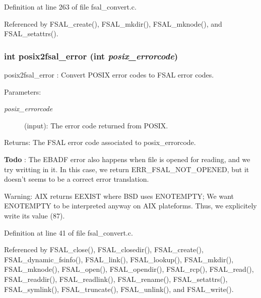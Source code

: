 Definition at line 263 of file fsal\_\-convert.c.

Referenced by FSAL\_\-create(), FSAL\_\-mkdir(), FSAL\_\-mknode(), and FSAL\_\-setattrs().
\subsubsection[{posix2fsal\_\-error}]{\setlength{\rightskip}{0pt plus 5cm}int posix2fsal\_\-error (int {\em posix\_\-errorcode})}\label{fsal__convert_8c_d420f004b68f6720ab45980298177bd9}


posix2fsal\_\-error : Convert POSIX error codes to FSAL error codes.

\begin{Desc}
\item[Parameters:]
\begin{description}
\item[{\em posix\_\-errorcode}](input): The error code returned from POSIX.\end{description}
\end{Desc}
\begin{Desc}
\item[Returns:]The FSAL error code associated to posix\_\-errorcode. \end{Desc}


\begin{Desc}
\item[{\bf Todo}]: The EBADF error also happens when file is opened for reading, and we try writting in it. In this case, we return ERR\_\-FSAL\_\-NOT\_\-OPENED, but it doesn't seems to be a correct error translation. \end{Desc}


\begin{Desc}
\item[Warning:]AIX returns EEXIST where BSD uses ENOTEMPTY; We want ENOTEMPTY to be interpreted anyway on AIX plateforms. Thus, we explicitely write its value (87). \end{Desc}


Definition at line 41 of file fsal\_\-convert.c.

Referenced by FSAL\_\-close(), FSAL\_\-closedir(), FSAL\_\-create(), FSAL\_\-dynamic\_\-fsinfo(), FSAL\_\-link(), FSAL\_\-lookup(), FSAL\_\-mkdir(), FSAL\_\-mknode(), FSAL\_\-open(), FSAL\_\-opendir(), FSAL\_\-rcp(), FSAL\_\-read(), FSAL\_\-readdir(), FSAL\_\-readlink(), FSAL\_\-rename(), FSAL\_\-setattrs(), FSAL\_\-symlink(), FSAL\_\-truncate(), FSAL\_\-unlink(), and FSAL\_\-write().
